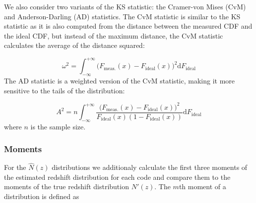 We also consider two variants of the KS statistic: the Cramer-von Mises (CvM) and Anderson-Darling (AD) statistics.
The CvM statistic is similar to the KS statistic as it is also computed from the distance between the measured CDF and the ideal CDF, but instead of the maximum distance, the CvM statistic calculates the average of the distance squared:

\begin{equation}
\label{eq:cvm}
\omega^2 = \int_{-\infty}^{+\infty}\big(F_{\mathrm{meas.}}(x) - F_{\mathrm{ideal}}(x)\big)^2\mathrm{d}F_{\mathrm{ideal}}
\end{equation}
The AD statistic is a weighted version of the CvM statistic, making it more sensitive to the tails of the distribution:

\begin{equation} \label{eq:ad}
A^2 = n\int_{-\infty}^{+\infty} \frac{\big(F_{\mathrm{meas.}}(x) - F_{\mathrm{ideal}}(x)\big)^2} {F_{\mathrm{ideal}}(x) (1-F_{\mathrm{ideal}}(x))}\mathrm{d}F_{\mathrm{ideal}}
\end{equation}
where $n$ is the sample size.

%


\subsubsection{Moments}
\label{sec:moments}
For the $\hat{N}(z)$ distributions we additionaly calculate the first three moments of the estimated redshift distribution for each code and compare them to the moments of the true redshift distribution $N'(z)$.
The $m$th moment of a distribution is defined as

